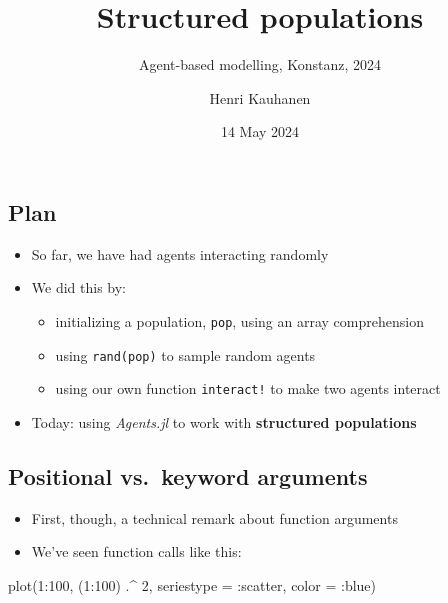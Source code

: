 \documentclass[
  letterpaper,
  DIV=11,
  numbers=noendperiod]{scrartcl}
\title{Structured populations}
\subtitle{Agent-based modelling, Konstanz, 2024}
\author{Henri Kauhanen}
\date{14 May 2024}
\newenvironment{Shaded}{\begin{snugshade}}{\end{snugshade}}
\newcommand{\FloatTok}[1]{\textcolor[rgb]{0.68,0.00,0.00}{#1}}
\newcommand{\FunctionTok}[1]{\textcolor[rgb]{0.28,0.35,0.67}{#1}}
\newcommand{\NormalTok}[1]{\textcolor[rgb]{0.00,0.23,0.31}{#1}}
\newcommand{\OperatorTok}[1]{\textcolor[rgb]{0.37,0.37,0.37}{#1}}
\providecommand{\tightlist}{%
  \setlength{\itemsep}{0pt}\setlength{\parskip}{0pt}}\usepackage{longtable,booktabs,array}
\begin{document}
\maketitle

\subsection{Plan}\label{plan}

\begin{itemize}
\tightlist
\item
  So far, we have had agents interacting randomly
\item
  We did this by:

  \begin{itemize}
  \tightlist
  \item
    initializing a population, \texttt{pop}, using an array
    comprehension
  \item
    using \texttt{rand(pop)} to sample random agents
  \item
    using our own function \texttt{interact!} to make two agents
    interact
  \end{itemize}
\end{itemize}

\begin{itemize}
\tightlist
\item
  Today: using \emph{Agents.jl} to work with \textbf{structured
  populations}
\end{itemize}

\subsection{Positional vs.~keyword
arguments}\label{positional-vs.-keyword-arguments}

\begin{itemize}
\tightlist
\item
  First, though, a technical remark about function arguments
\item
  We've seen function calls like this:
\end{itemize}

\begin{Shaded}
\begin{Highlighting}[]
\FunctionTok{plot}\NormalTok{(}\FloatTok{1}\OperatorTok{:}\FloatTok{100}\NormalTok{, (}\FloatTok{1}\OperatorTok{:}\FloatTok{100}\NormalTok{) }\OperatorTok{.\^{}} \FloatTok{2}\NormalTok{, seriestype }\OperatorTok{=} \OperatorTok{:}\NormalTok{scatter, color }\OperatorTok{=} \OperatorTok{:}\NormalTok{blue)}
\end{Highlighting}
\end{Shaded}
\end{document}
